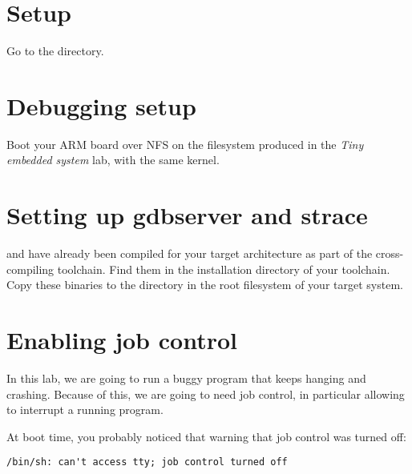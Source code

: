 
\section{Setup}

Go to the  directory.

\section{Debugging setup}

Boot your ARM board over NFS on the filesystem produced in the {\em
  Tiny embedded system} lab, with the same kernel.

\section{Setting up gdbserver and strace}

 and  have already been
compiled for your target architecture as part of the cross-compiling
toolchain. Find them in the installation directory of your
toolchain. Copy these binaries to the  directory in
the root filesystem of your target system.

\section{Enabling job control}

In this lab, we are going to run a buggy program that keeps hanging
and crashing.  Because of this, we are going to need job control, in
particular \code{[Ctrl] [C]} allowing to interrupt a running program.

At boot time, you probably noticed that warning that job control was
turned off:

\begin{verbatim}
/bin/sh: can't access tty; job control turned off
\end{verbatim}

